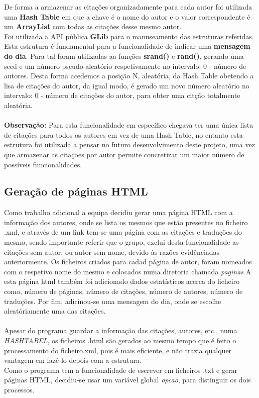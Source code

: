 \documentclass[11pt,a4paper]{report}%
\begin{document}
De forma a armazenar as citações organizadamente para cada autor foi utilizada uma \textbf{Hash Table} em que a chave é o nome do autor e o valor correspondente é um \textbf{ArrayList} com todas as citações desse mesmo autor.\\
Foi utilizada a API pública \textbf{GLib} para o manuseamento das estruturas referidas.
Esta estrutura é fundamental para a funcionalidade de indicar uma \textbf{mensagem do dia}. Para tal foram utilizadas aa funções \textbf{srand()} e \textbf{rand()}, gerando uma seed e um número pseudo-aleatório respetivamente no intervalo: 0 - número de autores. Desta forma acedemos a posição N, aleatória, da Hash Table obetendo a lisa de citações do autor, da igual modo, é gerado um novo número aleatório no intervalo: 0 - número de citações do autor, para obter uma citção totalmente aleatória.\\\\
\textbf{Observação:} Para esta funcionalidade em específico chegava ter uma única lista de citações para todos os autores em vez de uma Hash Table, no entanto esta estrutura foi utilizada a pensar no futuro desenvolvimento deste projeto, uma vez que armazenar as citaçoes por autor permite concretizar um maior número de possíveis funcionalidades.


\subsection{Geração de páginas HTML}
Como trabalho adicional a equipa decidiu gerar uma página HTML com a informação dos autores, onde se lista os mesmos que estão presentes no ficheiro .xml, e através de um link tem-se uma página com as citações e traduções do mesmo, sendo importante referir que o grupo, exclui desta funcionalidade as citações sem autor, ou autor sem nome, devido às razões evidênciadas anteriormente. Os ficheiros criados para cadad página de autor, foram nomeados com o respetivo nome do mesmo e colocados numa diretoria chamada \emph{paginas} A esta página html também foi adicionado dados estatísticos acerca do ficheiro como, número de páginas, número de citações, número de autores, número de traduções. Por fim, adicinou-se uma mensagem do dia, onde se escolhe aleatóriamente uma das citações.\\\\
Apesar do programa guardar a informação das citações, autores, etc., numa \emph{HASHTABEL}, os ficheiros .html são gerados ao mesmo tempo que é feito o processamento do ficheiro.xml, pois é mais eficiente, e não trazia qualquer vantagem em fazê-lo depois com a estrutura. \\Como o programa tem a funcionalidade de escrever em ficheiros .txt e gerar páginas HTML, decidiu-se usar um variável global \emph{opcao}, para distinguir os dois processos.
\end{document}
